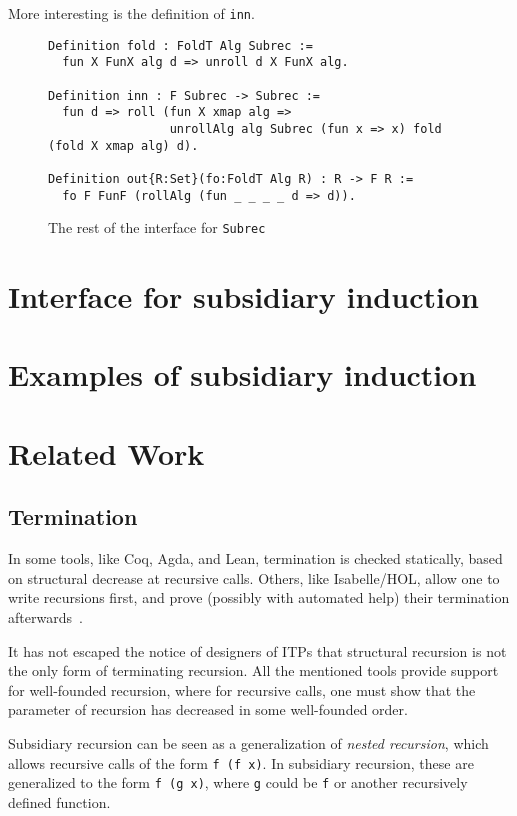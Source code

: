 \documentclass[a4paper,USenglish]{lipics-v2021}
\begin{document}
More interesting is the definition of \verb|inn|.

\begin{figure}
\begin{verbatim}
Definition fold : FoldT Alg Subrec := 
  fun X FunX alg d => unroll d X FunX alg.

Definition inn : F Subrec -> Subrec :=
  fun d => roll (fun X xmap alg =>
                 unrollAlg alg Subrec (fun x => x) fold (fold X xmap alg) d).

Definition out{R:Set}(fo:FoldT Alg R) : R -> F R :=
  fo F FunF (rollAlg (fun _ _ _ _ d => d)).
\end{verbatim}
\caption{The rest of the interface for \texttt{Subrec}}
\label{fig:subrecb}
\end{figure}


\section{Interface for subsidiary induction}
\label{sec:interfacei}

\section{Examples of subsidiary induction}
\label{sec:examplesi}

\section{Related Work}
\label{sec:related}

\subsection{Termination}
In some tools, like Coq, Agda, and Lean, termination is checked
statically, based on structural decrease at recursive calls.  Others,
like Isabelle/HOL, allow one to write recursions first, and prove
(possibly with automated help) their termination
afterwards~\cite{krauss}.

It has not escaped the notice of designers of ITPs that structural
recursion is not the only form of terminating recursion.  All the
mentioned tools provide support for well-founded recursion, where for
recursive calls, one must show that the parameter of recursion has
decreased in some well-founded order.

Subsidiary recursion can be seen as a generalization of \emph{nested
recursion}, which allows recursive calls of the form \verb|f (f x)|.
In subsidiary recursion, these are generalized to the form
\verb|f (g x)|, where \verb|g| could be \verb|f| or another
recursively defined function.
\end{document}

